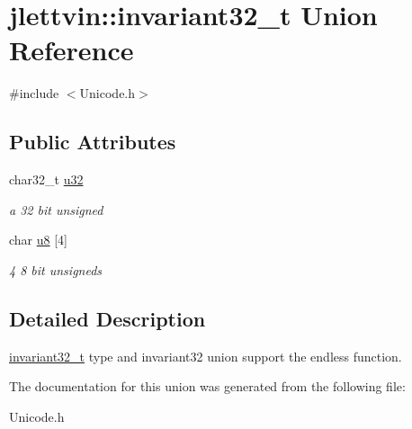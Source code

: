 \hypertarget{unionjlettvin_1_1invariant32__t}{}\section{jlettvin\+:\+:invariant32\+\_\+t Union Reference}
\label{unionjlettvin_1_1invariant32__t}


{\ttfamily \#include $<$Unicode.\+h$>$}

\subsection*{Public Attributes}
\begin{DoxyCompactItemize}
\item 
\hypertarget{unionjlettvin_1_1invariant32__t_a6b960207500139b0240058e81b9cb187}{}char32\+\_\+t \hyperlink{unionjlettvin_1_1invariant32__t_a6b960207500139b0240058e81b9cb187}{u32}\label{unionjlettvin_1_1invariant32__t_a6b960207500139b0240058e81b9cb187}

\begin{DoxyCompactList}\small\item\em a 32 bit unsigned \end{DoxyCompactList}\item 
\hypertarget{unionjlettvin_1_1invariant32__t_a2cb3b5517941742729f333a13d1d359b}{}char \hyperlink{unionjlettvin_1_1invariant32__t_a2cb3b5517941742729f333a13d1d359b}{u8} \mbox{[}4\mbox{]}\label{unionjlettvin_1_1invariant32__t_a2cb3b5517941742729f333a13d1d359b}

\begin{DoxyCompactList}\small\item\em 4 8 bit unsigneds \end{DoxyCompactList}\end{DoxyCompactItemize}


\subsection{Detailed Description}
\hyperlink{unionjlettvin_1_1invariant32__t}{invariant32\+\_\+t} type and invariant32 union support the endless function. 

The documentation for this union was generated from the following file\+:\begin{DoxyCompactItemize}
\item 
Unicode.\+h\end{DoxyCompactItemize}
